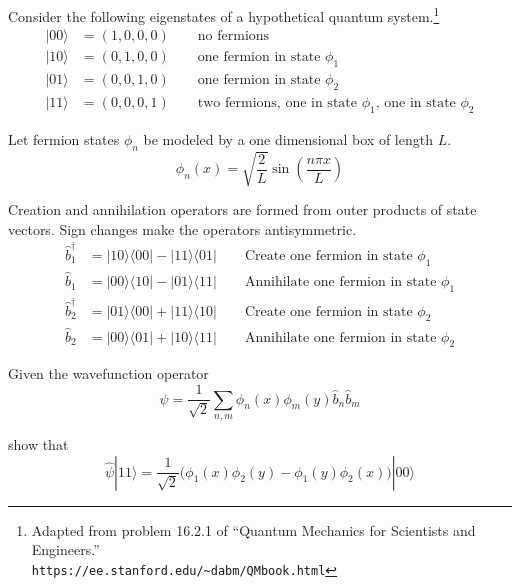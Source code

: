 \documentclass[12pt]{article}
\begin{document}
\noindent
Consider the following eigenstates of a hypothetical quantum system.\footnote{
Adapted from problem 16.2.1 of ``Quantum Mechanics for Scientists and Engineers.''\\
{\tt https://ee.stanford.edu/{\textasciitilde}dabm/QMbook.html}}
\begin{align*}
|00\rangle&=(1,0,0,0)\qquad\text{no fermions}\\
|10\rangle&=(0,1,0,0)\qquad\text{one fermion in state $\phi_1$}\\
|01\rangle&=(0,0,1,0)\qquad\text{one fermion in state $\phi_2$}\\
|11\rangle&=(0,0,0,1)\qquad\text{two fermions, one in state $\phi_1$, one in state $\phi_2$}
\end{align*}

\noindent
Let fermion states $\phi_n$ be modeled by a one dimensional box of length $L$.
\begin{equation*}
\phi_n(x)=\sqrt{\frac{2}{L}}\sin\left(\frac{n\pi x}{L}\right)
\end{equation*}

\noindent
Creation and annihilation operators are formed from outer products of state vectors.
Sign changes make the operators antisymmetric.
\begin{align*}
\hat{b}_1^\dag&=|10\rangle\langle00|-|11\rangle\langle01| \qquad\text{Create one fermion in state $\phi_1$}
\\
\hat{b}_1&=|00\rangle\langle10|-|01\rangle\langle11| \qquad\text{Annihilate one fermion in state $\phi_1$}
\\
\hat{b}_2^\dag&=|01\rangle\langle00|+|11\rangle\langle10| \qquad\text{Create one fermion in state $\phi_2$}
\\
\hat{b}_2&=|00\rangle\langle01|+|10\rangle\langle11| \qquad\text{Annihilate one fermion in state $\phi_2$}
\end{align*}

\noindent
Given the wavefunction operator
\begin{equation*}
\hat{\psi}=\frac{1}{\sqrt{2}}\sum_{n,m}\phi_n(x)\phi_m(y)\hat{b}_n\hat{b}_m
\end{equation*}

\noindent
show that
\begin{equation*}
\hat{\psi}|11\rangle=\frac{1}{\sqrt{2}}\big(\phi_1(x)\phi_2(y)-\phi_1(y)\phi_2(x)\big)|00\rangle
\end{equation*}
\end{document}
